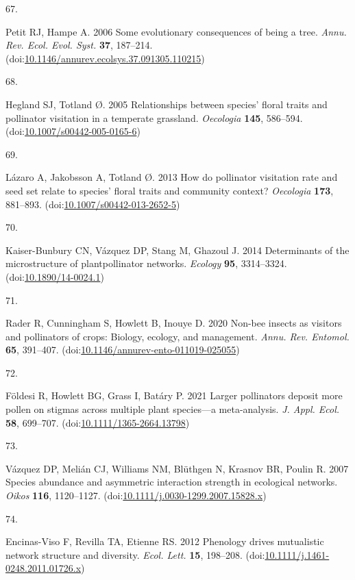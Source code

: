 \documentclass[
  12pt,
  a4paper,
]{article}
\newlength{\cslhangindent}
\newlength{\csllabelwidth}
\newlength{\cslentryspacingunit} %
\newenvironment{CSLReferences}[2] %
 {%
  \setlength{\parindent}{0pt}
  \ifodd #1
  \let\oldpar\par
  \def\par{\hangindent=\cslhangindent\oldpar}
  \fi
  \setlength{\parskip}{#2\cslentryspacingunit}
 }%
 {}
\newcommand{\CSLLeftMargin}[1]{\parbox[t]{\csllabelwidth}{#1}}
\newcommand{\CSLRightInline}[1]{\parbox[t]{\linewidth - \csllabelwidth}{#1}\break}
\begin{document}
\begin{CSLReferences}{0}{0}
\leavevmode{}%
\CSLLeftMargin{67. }
\CSLRightInline{Petit RJ, Hampe A. 2006 Some evolutionary consequences of being a tree. \emph{Annu. Rev. Ecol. Evol. Syst.} \textbf{37}, 187--214. (doi:\href{https://doi.org/10.1146/annurev.ecolsys.37.091305.110215}{10.1146/annurev.ecolsys.37.091305.110215})}

\leavevmode{}%
\CSLLeftMargin{68. }
\CSLRightInline{Hegland SJ, Totland Ø. 2005 Relationships between species' floral traits and pollinator visitation in a temperate grassland. \emph{Oecologia} \textbf{145}, 586--594. (doi:\href{https://doi.org/10.1007/s00442-005-0165-6}{10.1007/s00442-005-0165-6})}

\leavevmode{}%
\CSLLeftMargin{69. }
\CSLRightInline{Lázaro A, Jakobsson A, Totland Ø. 2013 How do pollinator visitation rate and seed set relate to species' floral traits and community context? \emph{Oecologia} \textbf{173}, 881--893. (doi:\href{https://doi.org/10.1007/s00442-013-2652-5}{10.1007/s00442-013-2652-5})}

\leavevmode{}%
\CSLLeftMargin{70. }
\CSLRightInline{Kaiser-Bunbury CN, Vázquez DP, Stang M, Ghazoul J. 2014 Determinants of the microstructure of plant\textendash pollinator networks. \emph{Ecology} \textbf{95}, 3314--3324. (doi:\href{https://doi.org/10.1890/14-0024.1}{10.1890/14-0024.1})}

\leavevmode{}%
\CSLLeftMargin{71. }
\CSLRightInline{Rader R, Cunningham S, Howlett B, Inouye D. 2020 Non-bee insects as visitors and pollinators of crops: Biology, ecology, and management. \emph{Annu. Rev. Entomol.} \textbf{65}, 391--407. (doi:\href{https://doi.org/10.1146/annurev-ento-011019-025055}{10.1146/annurev-ento-011019-025055})}

\leavevmode{}%
\CSLLeftMargin{72. }
\CSLRightInline{Földesi R, Howlett BG, Grass I, Batáry P. 2021 Larger pollinators deposit more pollen on stigmas across multiple plant species---a meta-analysis. \emph{J. Appl. Ecol.} \textbf{58}, 699--707. (doi:\href{https://doi.org/10.1111/1365-2664.13798}{10.1111/1365-2664.13798})}

\leavevmode{}%
\CSLLeftMargin{73. }
\CSLRightInline{Vázquez DP, Melián CJ, Williams NM, Blüthgen N, Krasnov BR, Poulin R. 2007 Species abundance and asymmetric interaction strength in ecological networks. \emph{Oikos} \textbf{116}, 1120--1127. (doi:\href{https://doi.org/10.1111/j.0030-1299.2007.15828.x}{10.1111/j.0030-1299.2007.15828.x})}

\leavevmode{}%
\CSLLeftMargin{74. }
\CSLRightInline{Encinas-Viso F, Revilla TA, Etienne RS. 2012 Phenology drives mutualistic network structure and diversity. \emph{Ecol. Lett.} \textbf{15}, 198--208. (doi:\href{https://doi.org/10.1111/j.1461-0248.2011.01726.x}{10.1111/j.1461-0248.2011.01726.x})}

\end{CSLReferences}
\end{document}
